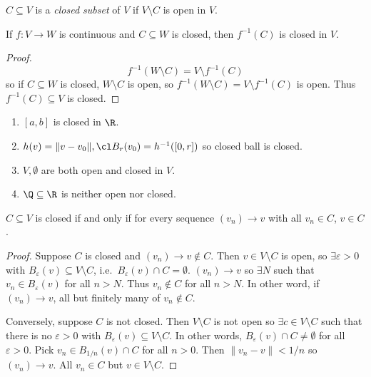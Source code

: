 \documentclass[a4paper]{article}
\theoremstyle{definition}
\begin{document}
\begin{definition}
  $C\subseteq V$ is a \emph{closed subset} of $V$ if $V\setminus C$ is open in $V$.
\end{definition}

\begin{corollary}
  If $f:V\to W$ is continuous and $C\subseteq W$ is closed, then $f^{-1}(C)$ is closed in $V$.
\end{corollary}

\begin{proof}
  \[
    f^{-1}(W\setminus C) = V\setminus f^{-1}(C)
  \]
  so if $C\subseteq W$ is closed, $W\setminus C$ is open, so $f^{-1}(W\setminus C) = V\setminus f^{-1}(C)$ is open. Thus $f^{-1}(C)\subseteq V$ is closed.
\end{proof}

\begin{eg}\leavevmode
  \begin{enumerate}
  \item $[a,b]$ is closed in $\R$.
  \item $h(v) = \|v-v_0\|, \cl B_r(v_0) = h^{-1}([0,r])$ so closed ball is closed.
  \item $V, \emptyset$ are both open and closed in $V$.
    \item $\Q \subseteq \R$ is neither open nor closed.
  \end{enumerate}
\end{eg}

\begin{proposition}
  \(C \subseteq V\) is closed if and only if for every sequence \((v_n) \to v\) with all \(v_n \in C\), \(v\in C\).
\end{proposition}

\begin{proof}
  Suppose \(C\) is closed and \((v_n)\to v \notin C\). Then \(v\in V\setminus C\) is open, so \(\exists \varepsilon>0\) with \(B_\varepsilon(v) \subseteq V\setminus C\), i.e.\ \(B_\varepsilon(v) \cap C =\emptyset\). \((v_n)\to v\) so \(\exists N\) such that \(v_n\in B_\varepsilon(v)\) for all \(n>N\). Thus \(v_n \notin C\) for all \(n>N\). In other word, if \((v_n)\to v\), all but finitely many of \(v_n \notin C\).

  Conversely, suppose \(C\) is not closed. Then \(V\setminus C\) is not open so \(\exists c \in V\setminus C\) such that there is no \(\varepsilon>0\) with \(B_\varepsilon(v) \subseteq V\setminus C\). In other words, \(B_\varepsilon(v) \cap C \neq \emptyset\) for all \(\varepsilon > 0\). Pick \(v_n\in B_{1/n}(v)\cap C\) for all \(n>0\). Then \(\|v_n-v\|< 1/n\) so \((v_n)\to v\). All \(v_n \in C\) but \(v\in V\setminus C\).
\end{proof}
\end{document}
